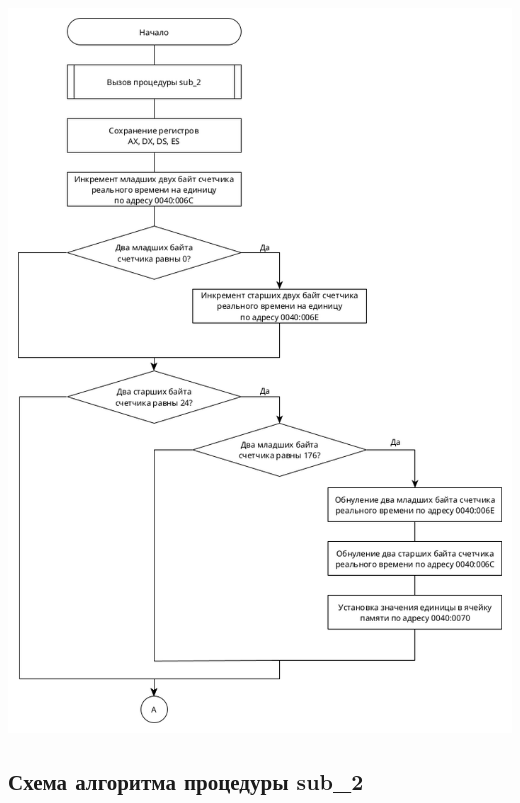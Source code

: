 \documentclass[14pt, a4paper]{article}
\begin{document}
	\begin{minipage}{0.9\linewidth}
		\includegraphics[width=\linewidth]{diagram1_1}
	\end{minipage}

	\pagebreak
	
	\subsection{Схема алгоритма процедуры sub\_2}
	
	\bigbreak
	
\end{document}
